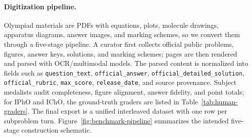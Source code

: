 \documentclass[11pt]{article}
\begin{document}
\begin{table}[t]
\centering
\footnotesize
\setlength{\tabcolsep}{3pt}
\renewcommand{\arraystretch}{1.08}
\vspace{-0.2cm}
\caption{\textsc{ScienceArena} benchmark sources. Release dates use YY-MM. ``Scale'' is the reported full score used in tables; rubric status and source caveats are retained in the released metadata.}
\label{tab:science_arena_sources}
\vspace{-0.5cm}
\end{table}

\paragraph{Digitization pipeline.}
Olympiad materials are PDFs with equations, plots, molecule drawings, apparatus diagrams, answer images, and marking schemes, so we convert them through a five-stage pipeline.
A curator first collects official public problems, figures, answer keys, solutions, and marking schemes; pages are then rendered and parsed with OCR/multimodal models.
The parsed content is normalized into fields such as \texttt{question\_text}, \texttt{official\_answer}, \texttt{official\_detailed\_solution}, \texttt{official\_rubric}, \texttt{max\_score}, \texttt{release\_date}, and source provenance.
Subject medalists audit completeness, figure alignment, answer fidelity, and point totals; for IPhO and IChO, the ground-truth graders are listed in Table~\ref{tab:human-graders}.
The final export is a unified interleaved dataset with one row per subproblem turn.
Figure~\ref{fig:benchmark-pipeline} summarizes the intended five-stage construction schematic.
\end{document}
